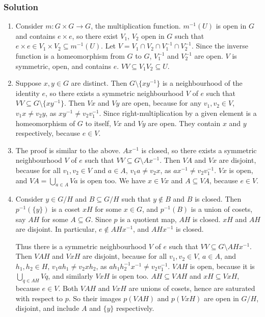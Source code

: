 \subsubsection{Solution}
\begin{enumerate}
\item Consider $m : G \times G \to G$, the multiplication function. $m^{-1}(U)$ is open in $G$ and contains $e \times e$, so there exist $V_1$, $V_2$ open in $G$ such that $e \times e \in V_1 \times V_2 \subseteq m^{-1}(U)$. Let $V = V_1 \cap V_2 \cap V_1^{-1} \cap V_2^{-1}$. Since the inverse function is a homeomorphism from $G$ to $G$, $V_1^{-1}$ and $V_2^{-1}$ are open. $V$ is symmetric, open, and contains $e$. $VV \subseteq V_1V_2 \subseteq U$.
\item Suppose $x, y \in G$ are distinct. Then $G \setminus \{xy^{-1}\}$ is a neighbourhood of the identity $e$, so there exists a symmetric neighbourhood $V$ of $e$ such that $VV \subseteq G \setminus \{xy^{-1}\}$. Then $Vx$ and $Vy$ are open, because for any $v_1, v_2 \in V$, $v_1x \neq v_2y$, as $xy^{-1} \neq v_2v_1^{-1}$. Since right-multiplication by a given element is a homeomorphism of $G$ to itself, $Vx$ and $Vy$ are open. They contain $x$ and $y$ respectively, because $e \in V$.
\item The proof is similar to the above. $Ax^{-1}$ is closed, so there exists a symmetric neighbourhood $V$ of $e$ such that $VV \subseteq G \setminus Ax^{-1}$. Then $VA$ and $Vx$ are disjoint, because for all $v_1, v_2 \in V$ and $a \in A$, $v_1a \neq v_2x$, as $ax^{-1} \neq v_2v_1^{-1}$. $Vx$ is open, and $VA = \bigcup_{a \in A} Va$ is open too. We have $x \in Vx$ and $A \subseteq VA$, because $e \in V$.

\item Consider $y \in G/H$ and $B \subseteq G/H$ such that $y \notin B$ and $B$ is closed. Then $p^{-1}(\{y\})$ is a coset $xH$ for some $x \in G$, and $p^{-1}(B)$ is a union of cosets, say $AH$ for some $A \subseteq G$. Since $p$ is a quotient map, $AH$ is closed. $xH$ and $AH$ are disjoint. In particular, $e \notin AHx^{-1}$, and $AHx^{-1}$ is closed.

Thus there is a symmetric neighbourhood $V$ of $e$ such that $VV \subseteq G \setminus AHx^{-1}$. Then $VAH$ and $VxH$ are disjoint, because for all $v_1, v_2 \in V$, $a \in A$, and $h_1, h_2 \in H$, $v_1ah_1 \neq v_2xh_2$, as $ah_1h_2^{-1}x^{-1} \neq v_2v_1^{-1}$. $VAH$ is open, because it is $\bigcup_{q \in AH} Vq$, and similarly $VxH$ is open too. $AH \subseteq VAH$ and $xH \subseteq VxH$, because $e \in V$. Both $VAH$ and $VxH$ are unions of cosets, hence are saturated with respect to $p$. So their images $p(VAH)$ and $p(VxH)$ are open in $G/H$, disjoint, and include $A$ and $\{y\}$ respectively.
\end{enumerate}

